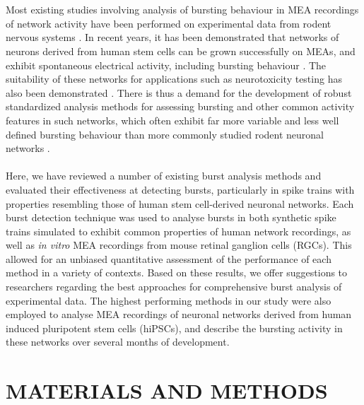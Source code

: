 \documentclass[12pt, titlepage]{article}
\begin{document}
	\\ \\ Most existing studies involving analysis of bursting behaviour in MEA recordings of network activity have been performed on experimental data from rodent nervous systems \cite{Charlesworth2015,Mazzoni2007}. In recent years, it has been demonstrated that networks of neurons derived from human stem cells can be grown successfully on MEAs, and exhibit spontaneous electrical activity, including bursting behaviour \cite{Illes2007,Heikkila2009}. The suitability of these networks for applications such as neurotoxicity testing has also been demonstrated \cite{Yla-Outinen2010}. There is thus a demand for the development of robust standardized analysis methods for assessing bursting and other common activity features in such networks, which often exhibit far more variable and less well defined bursting behaviour than more commonly studied rodent neuronal networks \cite{Kapucu2012}.
	\\ \\ Here, we have reviewed a number of existing burst analysis methods and evaluated their effectiveness at detecting bursts, particularly in spike trains with properties resembling those of human stem cell-derived neuronal networks. Each burst detection technique was used to analyse bursts in both synthetic spike trains simulated to exhibit common properties of human network recordings, as well as \textit{in vitro} MEA recordings from mouse retinal ganglion cells (RGCs). This allowed for an unbiased quantitative assessment of the performance of each method in a variety of contexts. Based on these results, we offer suggestions to researchers regarding the best approaches for comprehensive burst analysis of experimental data. The highest performing methods in our study were also employed to analyse MEA recordings of neuronal networks derived from human induced pluripotent stem cells (hiPSCs), and describe the bursting activity in these networks over several months of development.
\section*{MATERIALS AND METHODS}
\end{document}
